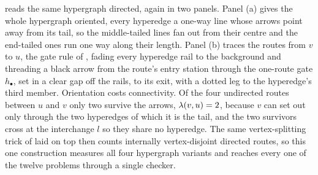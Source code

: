  reads the same hypergraph directed, again in two panels. Panel (a) gives the whole hypergraph oriented, every hyperedge a one-way line whose arrows point away from its tail, so the middle-tailed lines fan out from their centre and the end-tailed ones run one way along their length. Panel (b) traces the routes from $v$ to $u$, the gate rule of , fading every hyperedge rail to the background and threading a black arrow from the route's entry station through the one-route gate $h_{\bullet}$, set in a clear gap off the rails, to its exit, with a dotted leg to the hyperedge's third member. Orientation costs connectivity. Of the four undirected routes between $u$ and $v$ only two survive the arrows, $\lambda(v, u) = 2$, because $v$ can set out only through the two hyperedges of which it is the tail, and the two survivors cross at the interchange $l$ so they share no hyperedge. The same vertex-splitting trick of  laid on top then counts internally vertex-disjoint directed routes, so this one construction measures all four hypergraph variants and  reaches every one of the twelve problems through a single checker.

